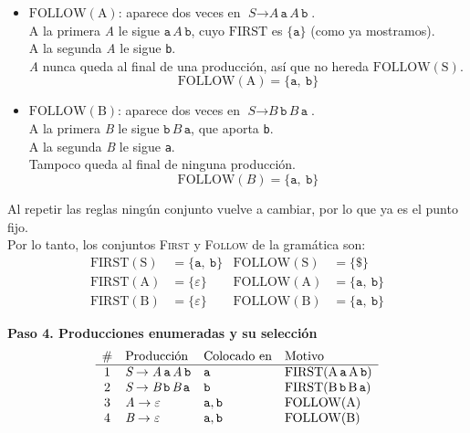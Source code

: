 \documentclass[12pt,letterpaper]{article}
\newcommand{\nt}[1]{\textit{#1}}
\newcommand{\tk}[1]{\texttt{#1}}
\newcommand{\tx}[1]{\text{#1}}
\newcommand{\First}[1]{\mathrm{FIRST}(#1)}
\newcommand{\Follow}[1]{\mathrm{FOLLOW}(#1)}
\newcommand{\eps}{\varepsilon}
\begin{document}
\begin{enumerate}[label=\arabic*.]
\begin{itemize}
  \item $\Follow{\tx{A}}$: aparece dos veces en $\nt{S}\to\nt{A}\,\tk{a}\,\nt{A}\,\tk{b}$.\\
    A la primera \nt{A} le sigue $\tk{a}\,\nt{A}\,\tk{b}$, cuyo $\mathrm{FIRST}$ es $\{\tk{a}\}$
    (como ya mostramos).\\
    A la segunda \nt{A} le sigue \tk{b}.\\
    \nt{A} nunca queda al final de una producción, así que no hereda $\Follow{\tx{S}}$.
    \[
    \Follow{\tx{A}} = \{\tk{a},\ \tk{b}\}
    \]

  \item $\Follow{\tx{B}}$: aparece dos veces en $\nt{S}\to\nt{B}\,\tk{b}\,\nt{B}\,\tk{a}$.\\
    A la primera \nt{B} le sigue $\tk{b}\,\nt{B}\,\tk{a}$, que aporta \tk{b}.\\
    A la segunda \nt{B} le sigue \tk{a}.\\
    Tampoco queda al final de ninguna producción.
    \[
    \Follow{\nt{B}} = \{\tk{a},\ \tk{b}\}
    \]
  \end{itemize}

  Al repetir las reglas ningún conjunto vuelve a cambiar, por lo que ya es el punto fijo.\\

  Por lo tanto, los conjuntos \textsc{First} y \textsc{Follow} de la gramática son:
  \[
  \begin{aligned}
    \First{\tx{S}} &= \{\tk{a},\ \tk{b}\} & \Follow{\tx{S}} &= \{\tk{\$}\} \\
    \First{\tx{A}} &= \{\eps\}            & \Follow{\tx{A}} &= \{\tk{a},\ \tk{b}\} \\
    \First{\tx{B}} &= \{\eps\}            & \Follow{\tx{B}} &= \{\tk{a},\ \tk{b}\}
  \end{aligned}
  \]

  \textbf{Paso 4. Producciones enumeradas y su selección}
  \[
  \begin{array}{c l l l}
    \# & \text{Producción} & \text{Colocado en} & \text{Motivo} \\ \hline
    1 & \nt{S}\to\nt{A}\,\tk{a}\,\nt{A}\,\tk{b} & \tk{a} & \First{\tx{A}\,\tk{a}\,\tx{A}\,\tk{b}} \\
    2 & \nt{S}\to\nt{B}\,\tk{b}\,\nt{B}\,\tk{a} & \tk{b} & \First{\tx{B}\,\tk{b}\,\tx{B}\,\tk{a}} \\
    3 & \nt{A}\to\eps & \tk{a},\tk{b} & \Follow{\tx{A}} \\
    4 & \nt{B}\to\eps & \tk{a},\tk{b} & \Follow{\tx{B}}
  \end{array}
  \]


\end{enumerate}
\end{document}
